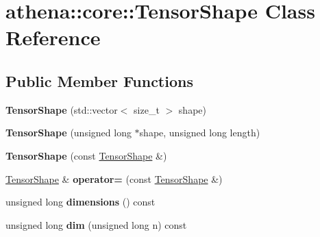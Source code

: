 \hypertarget{classathena_1_1core_1_1_tensor_shape}{}\section{athena\+:\+:core\+:\+:Tensor\+Shape Class Reference}
\label{classathena_1_1core_1_1_tensor_shape}
\subsection*{Public Member Functions}
\begin{DoxyCompactItemize}
\item 
\mbox{\label{classathena_1_1core_1_1_tensor_shape_ad20d31bd783690b3297831f0269e88a7}} 
{\bfseries Tensor\+Shape} (std\+::vector$<$ size\+\_\+t $>$ shape)
\item 
\mbox{\label{classathena_1_1core_1_1_tensor_shape_afee84a39eb172f5285dbef6fd1e730e2}} 
{\bfseries Tensor\+Shape} (unsigned long $\ast$shape, unsigned long length)
\item 
\mbox{\label{classathena_1_1core_1_1_tensor_shape_a4e64dcd3893bf156602edab7112ccf4e}} 
{\bfseries Tensor\+Shape} (const \mbox{\hyperlink{classathena_1_1core_1_1_tensor_shape}{Tensor\+Shape}} \&)
\item 
\mbox{\label{classathena_1_1core_1_1_tensor_shape_a75503b33e07596367c175d7667d354f5}} 
\mbox{\hyperlink{classathena_1_1core_1_1_tensor_shape}{Tensor\+Shape}} \& {\bfseries operator=} (const \mbox{\hyperlink{classathena_1_1core_1_1_tensor_shape}{Tensor\+Shape}} \&)
\item 
\mbox{\label{classathena_1_1core_1_1_tensor_shape_a73f686650f41bd7fa065aa16dfc4529f}} 
unsigned long {\bfseries dimensions} () const
\item 
\mbox{\label{classathena_1_1core_1_1_tensor_shape_ac0433f4e7a42e5307bb9fb976befdd47}} 
unsigned long {\bfseries dim} (unsigned long n) const
\item 
\mbox{\label{classathena_1_1core_1_1_tensor_shape_a81219fb0b0e3e6852cb02fbbcf059882}} 

\end{DoxyCompactItemize}
